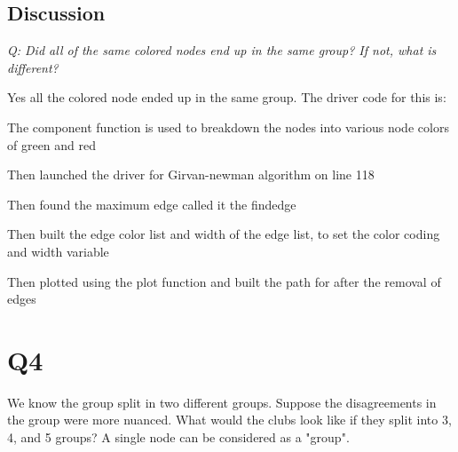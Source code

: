 \documentclass[12pt]{article}
\begin{document}
\subsection*{Discussion}
\emph{Q: Did all of the same colored nodes end up in the same group? If not, what is different?}

Yes all the colored node ended up in the same group. The driver code for this is:

\begin{itemize}


The component function is used to breakdown the nodes into various node colors of green and red


Then launched the driver for Girvan-newman algorithm on line 118

        
Then found the maximum edge called it the findedge


Then built the edge color list and width of the edge list, to set the color coding and width variable


Then plotted using the plot function and built the path for after the removal of edges

        
\end{itemize}

\section*{Q4}
We know the group split in two different groups. Suppose the disagreements in the group were more nuanced. What would the clubs look like if they split into 3, 4, and 5 groups? A single node can be considered as a "group".
\end{document}

